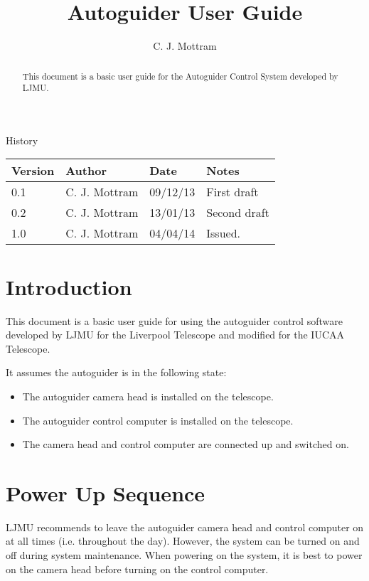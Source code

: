 \documentclass[10pt,a4paper]{article}
\title{Autoguider User Guide}
\author{C. J. Mottram}
\date{}
\begin{document}
\thispagestyle{empty}
\maketitle
\begin{abstract}
This document is a basic user guide for the Autoguider Control System developed by LJMU.
\end{abstract}
\centerline{\Large History}
\begin{center}
\begin{tabular}{|l|l|l|p{15em}|}
\hline
{\bf Version} & {\bf Author} & {\bf Date} & {\bf Notes} \\
\hline
0.1 & C. J. Mottram & 09/12/13 & First draft \\
0.2 & C. J. Mottram & 13/01/13 & Second draft \\
1.0 & C. J. Mottram & 04/04/14 & Issued. \\
\hline
\end{tabular}
\end{center}

\newpage
\tableofcontents
\listoffigures
\listoftables
\newpage

\section{Introduction}
This document is a basic user guide for using the autoguider control software developed by LJMU for the 
Liverpool Telescope and modified for the IUCAA Telescope.

It assumes the autoguider is in the following state:

\begin{itemize}
\item The autoguider camera head is installed on the telescope.
\item The autoguider control computer is installed on the telescope.
\item The camera head and control computer are connected up and switched on.
\end{itemize}

\section{Power Up Sequence}

LJMU recommends to leave the autoguider camera head and control computer on at all times (i.e. throughout the day).
However, the system can be turned on and off during system maintenance. When powering on the system, it is best to
power on the camera head before turning on the control computer.
\end{document}
